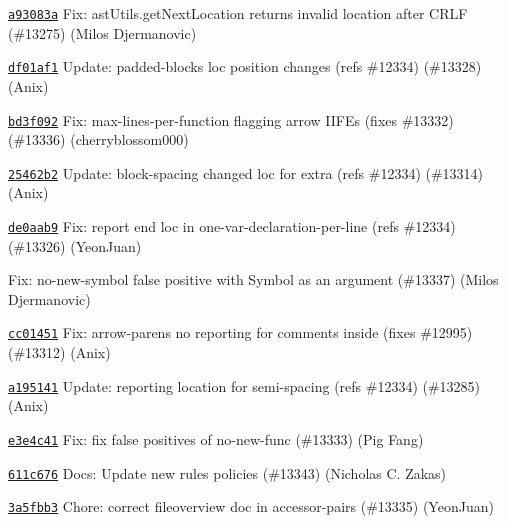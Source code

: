 \begin{DoxyItemize}
\item \href{https://github.com/eslint/eslint/commit/a93083af89c6f9714dcdd4a7f27c8655a0b0dba6}{\texttt{ {\ttfamily a93083a}}} Fix\+: ast\+Utils.\+get\+Next\+Location returns invalid location after CRLF (\#13275) (Milos Djermanovic)
\item \href{https://github.com/eslint/eslint/commit/df01af184d93b3d64b37cee786cad59bd0d7aacb}{\texttt{ {\ttfamily df01af1}}} Update\+: padded-\/blocks loc position changes (refs \#12334) (\#13328) (Anix)
\item \href{https://github.com/eslint/eslint/commit/bd3f092efa579944f75bfbc277b35f85e6d966ed}{\texttt{ {\ttfamily bd3f092}}} Fix\+: max-\/lines-\/per-\/function flagging arrow IIFEs (fixes \#13332) (\#13336) (cherryblossom000)
\item \href{https://github.com/eslint/eslint/commit/25462b23eac4ed1ded97eeae6187b5d8baa58e78}{\texttt{ {\ttfamily 25462b2}}} Update\+: block-\/spacing changed loc for extra (refs \#12334) (\#13314) (Anix)
\item \href{https://github.com/eslint/eslint/commit/de0aab95005f172db72196fc3fd18e91ee9a5880}{\texttt{ {\ttfamily de0aab9}}} Fix\+: report end loc in one-\/var-\/declaration-\/per-\/line (refs \#12334) (\#13326) (Yeon\+Juan)
\item \href{https://github.com/eslint/eslint/commit/1710296082083602a904b080908657bb431fb56c}{\texttt{ {}}} Fix\+: no-\/new-\/symbol false positive with Symbol as an argument (\#13337) (Milos Djermanovic)
\item \href{https://github.com/eslint/eslint/commit/cc014514c29626e556acb0a528e3478b3725e284}{\texttt{ {\ttfamily cc01451}}} Fix\+: arrow-\/parens no reporting for comments inside (fixes \#12995) (\#13312) (Anix)
\item \href{https://github.com/eslint/eslint/commit/a19514193a42f4f00732559ff828b33a6ec9d7c5}{\texttt{ {\ttfamily a195141}}} Update\+: reporting location for semi-\/spacing (refs \#12334) (\#13285) (Anix)
\item \href{https://github.com/eslint/eslint/commit/e3e4c41ab625a5af8d4614d1c6d32c656f104f6b}{\texttt{ {\ttfamily e3e4c41}}} Fix\+: fix false positives of no-\/new-\/func (\#13333) (Pig Fang)
\item \href{https://github.com/eslint/eslint/commit/611c676dfd671013d81810724f184e2a9c5ad5d7}{\texttt{ {\ttfamily 611c676}}} Docs\+: Update new rules policies (\#13343) (Nicholas C. Zakas)
\item \href{https://github.com/eslint/eslint/commit/3a5fbb3d634be688615950c0a5fa8aead6ff08b5}{\texttt{ {\ttfamily 3a5fbb3}}} Chore\+: correct fileoverview doc in accessor-\/pairs (\#13335) (Yeon\+Juan)

\end{DoxyItemize}
